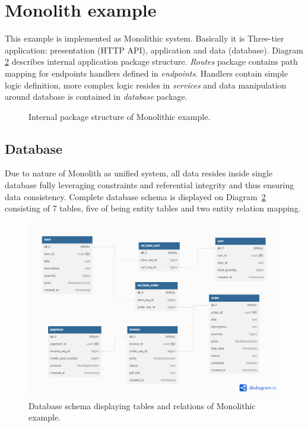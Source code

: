 \section{Monolith example}
This example is implemented as Monolithic system. Basically it is Three-tier application: presentation (HTTP API), application and data (database). Diagram \ref{img:monolith_db_schema} describes internal application package structure. \textit{Routes} package contains path mapping for endpoints handlers defined in \textit{endpoints}. Handlers contain simple logic definition, more complex logic resides in \textit{services} and data manipulation around database is contained in \textit{database} package.

\begin{figure}
    \centering
    
    \caption{Internal package structure of Monolithic example. \label{img:monolith_package}}
\end{figure}


\subsection{Database}
Due to nature of Monolith as unified system, all data resides inside single database fully leveraging constraints and referential integrity and thus ensuring data consistency. Complete database schema is displayed on Diagram~\ref{img:monolith_db_schema} consisting of 7 tables, five of being entity tables and two entity relation mapping.

\begin{figure}
    \centering
    \includegraphics[width=\textwidth]{images/monolith_db_schema.png}
    \caption{Database schema displaying tables and relations of Monolithic example. \label{img:monolith_db_schema}}
\end{figure}



